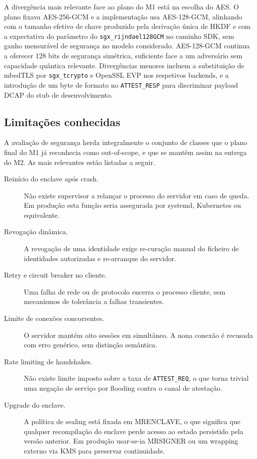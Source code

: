 A divergência mais relevante face ao plano do M1 está na escolha do AES. O plano fixava AES-256-GCM e a implementação usa AES-128-GCM, alinhando com o tamanho efetivo de chave produzido pela derivação única de HKDF e com a expectativa do parâmetro do \texttt{sgx\_rijndael128GCM} no caminho SDK, sem ganho mensurável de segurança no modelo considerado. AES-128-GCM continua a oferecer 128 bits de segurança simétrica, suficiente face a um adversário sem capacidade quântica relevante. Divergências menores incluem a substituição de mbedTLS por \texttt{sgx\_tcrypto} e OpenSSL EVP nos respetivos backends, e a introdução de um byte de formato no \texttt{ATTEST\_RESP} para discriminar payload DCAP do stub de desenvolvimento.

\subsection{Limitações conhecidas}

A avaliação de segurança herda integralmente o conjunto de classes que o plano final do M1 já reconhecia como out-of-scope, e que se mantêm assim na entrega do M2. As mais relevantes estão listadas a seguir.

\begin{description}
  \item[Reinício do enclave após crash.] Não existe supervisor a relançar o processo do servidor em caso de queda. Em produção esta função seria assegurada por systemd, Kubernetes ou equivalente.
  \item[Revogação dinâmica.] A revogação de uma identidade exige re-curação manual do ficheiro de identidades autorizadas e re-arranque do servidor.
  \item[Retry e circuit breaker no cliente.] Uma falha de rede ou de protocolo encerra o processo cliente, sem mecanismos de tolerância a falhas transientes.
  \item[Limite de conexões concorrentes.] O servidor mantém oito sessões em simultâneo. A nona conexão é recusada com erro genérico, sem distinção semântica.
  \item[Rate limiting de handshakes.] Não existe limite imposto sobre a taxa de \texttt{ATTEST\_REQ}, o que torna trivial uma negação de serviço por flooding contra o canal de atestação.
  \item[Upgrade do enclave.] A política de sealing está fixada em MRENCLAVE, o que significa que qualquer recompilação do enclave perde acesso ao estado persistido pela versão anterior. Em produção usar-se-ia MRSIGNER ou um wrapping externo via KMS para preservar continuidade.
\end{description}

